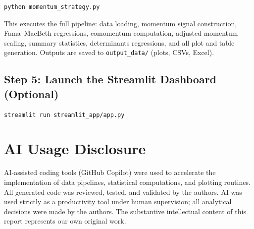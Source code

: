\documentclass[10pt]{article}
\begin{document}
\begin{verbatim}
python momentum_strategy.py
\end{verbatim}

\noindent This executes the full pipeline: data loading, momentum signal construction, Fama--MacBeth regressions, comomentum computation, adjusted momentum scaling, summary statistics, determinants regressions, and all plot and table generation. Outputs are saved to \texttt{output\_data/} (plots, CSVs, Excel).

\subsection*{Step 5: Launch the Streamlit Dashboard (Optional)}

\begin{verbatim}
streamlit run streamlit_app/app.py
\end{verbatim}


\clearpage
\section{AI Usage Disclosure}
\label{sec:appendix-ai-disclosure}

AI-assisted coding tools (GitHub Copilot) were used to accelerate the implementation of data pipelines, statistical computations, and plotting routines. All generated code was reviewed, tested, and validated by the authors. AI was used strictly as a productivity tool under human supervision; all analytical decisions were made by the authors. The substantive intellectual content of this report represents our own original work.
\end{document}
